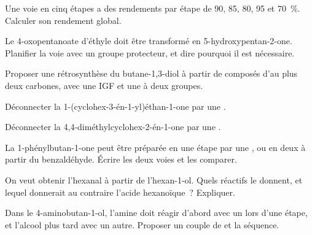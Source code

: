 \begin{exercise}[$\star$]\label{exo:b2:retrosynthesis:3}
Une voie en cinq étapes a des rendements par étape de 90, 85, 80, 95 et 70~\%. Calculer son rendement global.
\end{exercise}

\begin{exercise}[$\star$]\label{exo:b2:retrosynthesis:4}
Le 4-oxopentanoate d'éthyle doit être transformé en 5-hydroxypentan-2-one. Planifier la voie avec un
groupe protecteur, et dire pourquoi il est nécessaire.
\end{exercise}

\begin{exercise}[$\star\star$]\label{exo:b2:retrosynthesis:5}
Proposer une rétrosynthèse du butane-1,3-diol à partir de composés d'au plus deux carbones, avec une IGF
et une  à deux groupes.
\end{exercise}

\begin{exercise}[$\star\star$]\label{exo:b2:retrosynthesis:6}
Déconnecter la 1-(cyclohex-3-én-1-yl)éthan-1-one par une .
\end{exercise}

\begin{exercise}[$\star\star$]\label{exo:b2:retrosynthesis:7}
Déconnecter la 4,4-diméthylcyclohex-2-én-1-one par une .
\end{exercise}

\begin{exercise}[$\star\star$]\label{exo:b2:retrosynthesis:8}
La 1-phénylbutan-1-one peut être préparée en une étape par une , ou en deux
à partir du benzaldéhyde. Écrire les deux voies et les comparer.
\end{exercise}

\begin{exercise}[$\star\star$]\label{exo:b2:retrosynthesis:9}
On veut obtenir l'hexanal à partir de l'hexan-1-ol. Quels réactifs le donnent, et lequel donnerait au
contraire l'acide hexanoïque~? Expliquer.
\end{exercise}

\begin{exercise}[$\star\star\star$]\label{exo:b2:retrosynthesis:10}
Dans le 4-aminobutan-1-ol, l'amine doit réagir d'abord avec un  lors d'une étape, et
l'alcool plus tard avec un autre. Proposer un couple de  et la séquence.
\end{exercise}

